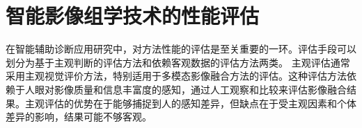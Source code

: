 

\section{智能影像组学技术的性能评估}
在智能辅助诊断应用研究中，对方法性能的评估是至关重要的一环。评估手段可以划分为基于主观判断的评估方法和依赖客观数据的评估方法两类。
主观评估通常采用主观视觉评价方法，特别适用于多模态影像融合方法的评估。这种评估方法依赖于人眼对影像质量和信息丰富度的感知，通过人工观察和比较来评估影像融合结果。主观评估的优势在于能够捕捉到人的感知差异，但缺点在于受主观因素和个体差异的影响，结果可能不够客观。

